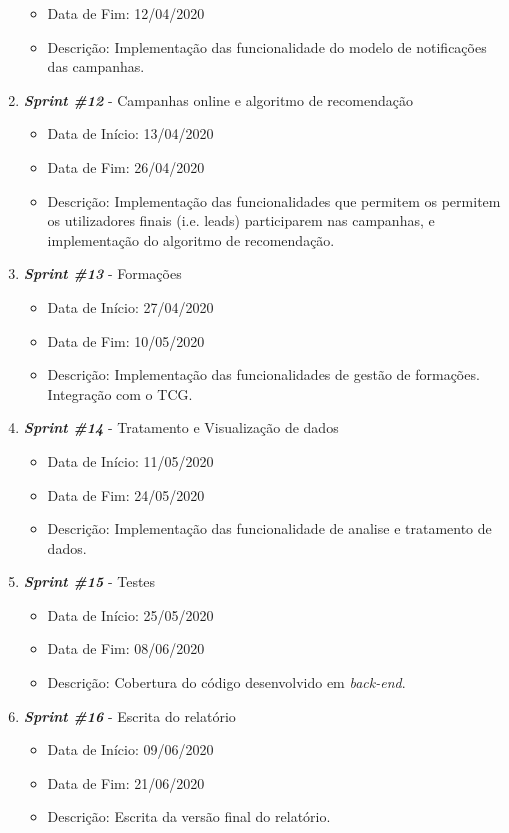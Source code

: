 \begin{enumerate}
\begin{itemize}
		\item Data de Fim: 12/04/2020
		\item Descrição: Implementação das funcionalidade do modelo de notificações das campanhas.
	\end{itemize}
	\item \textit{\textbf{Sprint \#12}} - Campanhas online e algoritmo de recomendação
	\begin{itemize}
		\item Data de Início: 13/04/2020
		\item Data de Fim: 26/04/2020
		\item Descrição: Implementação das funcionalidades que permitem os permitem os utilizadores finais (i.e. leads) participarem nas campanhas, e implementação do algoritmo de recomendação.
	\end{itemize}
	\item \textit{\textbf{Sprint \#13}} - Formações
	\begin{itemize}
		\item Data de Início: 27/04/2020
		\item Data de Fim: 10/05/2020
		\item Descrição: Implementação das funcionalidades de gestão de formações. Integração com o TCG.
	\end{itemize}
	\item \textit{\textbf{Sprint \#14}} - Tratamento e Visualização de dados
	\begin{itemize}
		\item Data de Início: 11/05/2020
		\item Data de Fim: 24/05/2020
		\item Descrição: Implementação das funcionalidade de analise e tratamento de dados. 
	\end{itemize}
	\item \textit{\textbf{Sprint \#15}} - Testes
	\begin{itemize}
		\item Data de Início: 25/05/2020
		\item Data de Fim: 08/06/2020
		\item Descrição: Cobertura do código desenvolvido em \textit{back-end}.
	\end{itemize}
	\item \textit{\textbf{Sprint \#16}} - Escrita do relatório
	\begin{itemize}
		\item Data de Início: 09/06/2020
		\item Data de Fim: 21/06/2020
		\item Descrição: Escrita da versão final do relatório.
	\end{itemize}
\end{enumerate}

